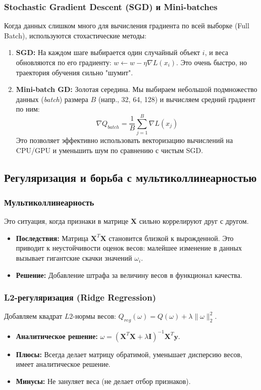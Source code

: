 \documentclass[12pt]{article}
\begin{document}
\subsubsection{Stochastic Gradient Descent (SGD) и Mini-batches}
Когда данных слишком много для вычисления градиента по всей выборке (Full Batch), используются стохастические методы:
\begin{enumerate}
    \item \textbf{SGD:} На каждом шаге выбирается один случайный объект $i$, и веса обновляются по его градиенту: $w \leftarrow w - \eta \nabla L(x_i)$. Это очень быстро, но траектория обучения сильно "шумит".
    \item \textbf{Mini-batch GD:} Золотая середина. Мы выбираем небольшой подмножество данных (\textit{batch}) размера $B$ (напр., 32, 64, 128) и вычисляем средний градиент по ним:
    \[ \nabla Q_{batch} = \frac{1}{B} \sum_{j=1}^B \nabla L(x_j) \]
    Это позволяет эффективно использовать векторизацию вычислений на CPU/GPU и уменьшить шум по сравнению с чистым SGD.
\end{enumerate}


\subsection{Регуляризация и борьба с мультиколлинеарностью}

\subsubsection{Мультиколлинеарность}
Это ситуация, когда признаки в матрице $\mathbf{X}$ сильно коррелируют друг с другом.
\begin{itemize}
    \item \textbf{Последствия:} Матрица $\mathbf{X}^T \mathbf{X}$ становится близкой к вырожденной. Это приводит к неустойчивости оценок весов: малейшее изменение в данных вызывает гигантские скачки значений $\omega_i$.
    \item \textbf{Решение:} Добавление штрафа за величину весов в функционал качества.
\end{itemize}

\subsubsection{L2-регуляризация (Ridge Regression)}
Добавляем квадрат $L2$-нормы весов: $Q_{reg}(\omega) = Q(\omega) + \lambda \|\omega\|^2_2$.
\begin{itemize}
    \item \textbf{Аналитическое решение:} $\omega = (\mathbf{X}^T \mathbf{X} + \lambda \mathbf{I})^{-1} \mathbf{X}^T \mathbf{y}$.
    \item \textbf{Плюсы:} Всегда делает матрицу обратимой, уменьшает дисперсию весов, имеет аналитическое решение.
    \item \textbf{Минусы:} Не зануляет веса (не делает отбор признаков).
\end{itemize}
\end{document}
